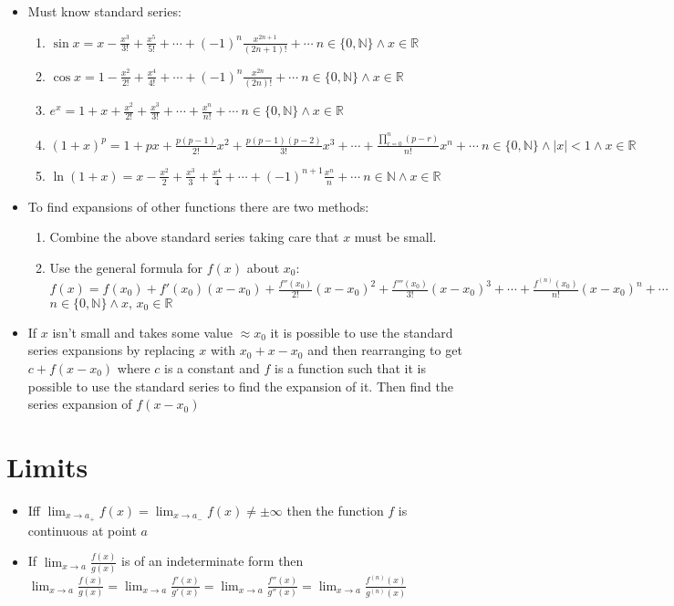 \documentclass{article}
\begin{document}
\begin{itemize}
\item Must know standard series:
\begin{enumerate}
\item \(\sin x=x-\frac{x^3}{3!}+\frac{x^5}{5!}+\cdots+(-1)^n\frac{x^{2n+1}}{(2n+1)!}+\cdots~n\in\{0, \mathbb{N}\}\wedge x\in\mathbb{R}\)
\item \(\cos x=1-\frac{x^2}{2!}+\frac{x^4}{4!}+\cdots+(-1)^n\frac{x^{2n}}{(2n)!}+\cdots~n\in\{0, \mathbb{N}\}\wedge x\in\mathbb{R}\)
\item \(e^x=1+x+\frac{x^2}{2!}+\frac{x^3}{3!}+\cdots+\frac{x^n}{n!}+\cdots~n\in\{0, \mathbb{N}\}\wedge x\in\mathbb{R}\)
\item \((1+x)^p=1+px+\frac{p(p-1)}{2!}x^2+\frac{p(p-1)(p-2)}{3!}x^3+\cdots+\frac{\prod_{r=0}^{n}(p-r)}{n!}x^n+\cdots~n\in\{0,\mathbb{N}\}\wedge |x|<1\wedge x\in\mathbb{R}\)
\item \(\ln(1+x)=x-\frac{x^2}{2}+\frac{x^3}{3}+\frac{x^4}{4}+\cdots+(-1)^{n+1}\frac{x^n}{n}+\cdots~n\in\mathbb{N}\wedge x\in\mathbb{R}\)
\end{enumerate}
\item To find expansions of other functions there are two methods:
\begin{enumerate}
\item Combine the above standard series taking care that \(x\) must be small.
\item Use the general formula for \(f(x)\) about \(x_0\):\\
\(f(x)=f(x_0)+f'(x_0)(x-x_0)+\frac{f''(x_0)}{2!}(x-x_0)^2+\frac{f'''(x_0)}{3!}(x-x_0)^3+\cdots+\frac{f^{(n)}(x_0)}{n!}(x-x_0)^n+\cdots\)\\ \(n\in\{0,\mathbb{N}\}\wedge x,\,x_0\in\mathbb{R}\)
\end{enumerate}
\item If \(x\) isn't small and takes some value \(\approx x_0\) it is possible to use the standard series expansions by replacing \(x\) with \(x_0+x-x_0\) and then rearranging to get \(c+f(x-x_0)\) where \(c\) is a constant and \(f\) is a function such that it is possible to use the standard series to find the expansion of it. Then find the series expansion of \(f(x-x_0)\)
\end{itemize}

\section*{Limits}
\begin{itemize}
\item Iff \(\displaystyle{\lim_{x\to a_+}f(x)=\lim_{x\to a_-}f(x)\ne\pm\infty}\) then the function \(f\) is continuous at point \(a\)
\item If \(\displaystyle{\lim_{x\to a}\frac{f(x)}{g(x)}}\) is of an indeterminate form then \(\displaystyle{\lim_{x\to a}\frac{f(x)}{g(x)}=\lim_{x\to a}\frac{f'(x)}{g'(x)}=\lim_{x\to a}\frac{f''(x)}{g''(x)}=\lim_{x\to a}\frac{f^{(n)}(x)}{g^{(n)}(x)}}\)
\end{itemize}
\end{document}
